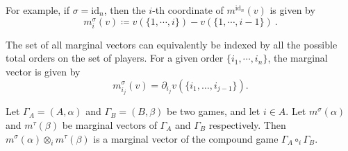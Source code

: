 \documentclass[a4paper,12pt]{amsart}
\begin{document}
\begin{example}
For example, if $\sigma = \mathrm{id}_n$, then the $i$-th coordinate of $m^{\mathrm{id}_n}(v)$ is given by
\[
m^\sigma_i(v) \coloneqq v(\{1,\cdots,i\}) - v(\{1,\cdots,i-1\})~.
\]
\end{example}

\begin{remark}
    The set of all marginal vectors can equivalently be indexed by all the possible total orders on the set of players. For a given order $\{i_1,\cdots,i_n\}$, the marginal vector is given by 
    \[
    m^\sigma_{i_j}(v) = \partial_{i_j} v(\{i_1, \ldots, i_{j-1}\}).
    \]
\end{remark}

\begin{proposition}\label{proposition: composition of marginal vectors}
Let $\Gamma_A = (A, \alpha)$ and $\Gamma_B = (B, \beta)$ be two games, and let $i \in A$. Let $m^\sigma(\alpha)$ and $m^\tau(\beta)$ be marginal vectors of $\Gamma_A$ and $\Gamma_B$ respectively. Then $m^\sigma(\alpha) \otimes_i m^\tau(\beta)$ is a marginal vector of the compound game $\Gamma_A \circ_i \Gamma_B$. 
\end{proposition}
\end{document}
